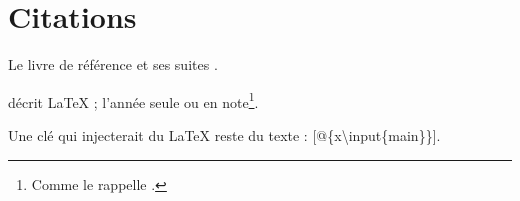\section{Citations}\label{citations}

Le livre de référence \citep[p.~3]{knuth84} et ses suites \citep[voir][chap.~2]{knuth84, lamport94}.

\citet{lamport94} décrit LaTeX ; l'année seule \citeyearpar{lamport94} ou en note\footnote{Comme le rappelle \citet{knuth84}.}.

Une clé qui injecterait du LaTeX reste du texte : {{[}@\{x\textbackslash input\{main\}\}{]}}.
